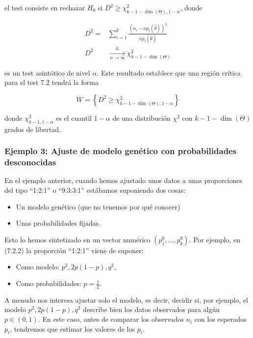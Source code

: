 \documentclass[
]{article}
\providecommand{\tightlist}{%
  \setlength{\itemsep}{0pt}\setlength{\parskip}{0pt}}
\begin{document}
el test consiste en rechazar \(H_{0}\) si \(D^{2} \geq \chi_{k-1-\operatorname{dim}(\Theta), 1-\alpha}^{2}\), donde

\[
\begin{aligned}
D^{2}= & \sum_{i=1}^{k} \frac{\left(n_{i}-n p_{i}(\hat{\theta})\right)^{2}}{n p_{i}(\hat{\theta})} \\
D^{2} & \underset{n \rightarrow \infty}{\stackrel{£}{\rightarrow}} \chi_{k-1-\operatorname{dim}(\Theta)}^{2}
\end{aligned}
\]

es un test asintótico de nivel \(\alpha\).
Este resultado establece que una región crítica para el test 7.2 tendrá la forma

\[
W=\left\{D^{2} \geq \chi_{k-1-\operatorname{dim}(\Theta), 1-\alpha}^{2}\right\}
\]

donde \(\chi_{k-1,1-\alpha}^{2}\) es el cuantil \(1-\alpha\) de una distribución \(\chi^{2}\) con \(k-1-\operatorname{dim}(\Theta)\) grados de libertad.

\subsubsection{Ejemplo 3: Ajuste de modelo genético con probabilidades desconocidas}\label{ejemplo-3-ajuste-de-modelo-genuxe9tico-con-probabilidades-desconocidas}

En el ejemplo anterior, cuando hemos ajustado unos datos a unas proporciones del tipo ``1:2:1'' o ``9:3:3:1'' estábamos suponiendo dos cosas:

\begin{itemize}
\tightlist
\item
  Un modelo genético (que no tenemos por qué conocer)
\item
  Unas probabilidades fijadas.
\end{itemize}

Esto lo hemos sintetizado en un vector numérico \(\left(p_{1}^{0}, \ldots, p_{k}^{0}\right)\). Por ejemplo, en (7.2.2) la proporción ``1:2:1'' viene de suponer:

\begin{itemize}
\tightlist
\item
  Como modelo: \(p^{2}, 2 p(1-p), q^{2}\),
\item
  Como probabilidades: \(p=\frac{1}{2}\).
\end{itemize}

A menudo nos interesa ajustar solo el modelo, es decir, decidir si, por ejemplo, el modelo \(p^{2}, 2 p(1-p), q^{2}\) describe bien los datos observados para algún \(p \in(0,1)\). En este caso, antes de comparar los observados \(n_{i}\) con los esperados \(p_{i}\), tendremos que estimar los valores de los \(p_{i}\).
\end{document}

